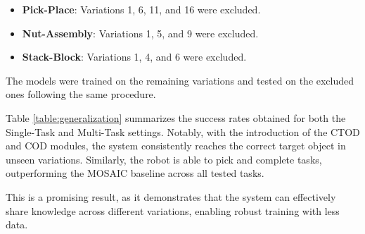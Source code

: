 \begin{itemize}
    \item \textbf{Pick-Place}: Variations 1, 6, 11, and 16 were excluded.
    \item \textbf{Nut-Assembly}: Variations 1, 5, and 9 were excluded.
    \item \textbf{Stack-Block}: Variations 1, 4, and 6 were excluded.
\end{itemize}

The models were trained on the remaining variations and tested on the excluded ones following the same procedure.

Table \ref{table:generalization} summarizes the success rates obtained for both the Single-Task and Multi-Task settings. Notably, with the introduction of the CTOD and COD modules, the system consistently reaches the correct target object in unseen variations. Similarly, the robot is able to pick and complete tasks, outperforming the MOSAIC baseline across all tested tasks.

This is a promising result, as it demonstrates that the system can effectively share knowledge across different variations, enabling robust training with less data.


